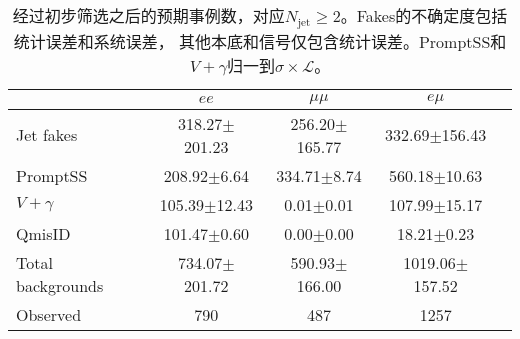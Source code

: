 \begin{table}[h]
\begin{center}
\begin{tabular}{l|cccc}
\hline
\hline
                 &$ee$                   &$\mu\mu$            &$e\mu$           \\
\hline
Jet fakes        &318.27$\pm$201.23       &256.20$\pm$165.77       &332.69$\pm$156.43 \\
 PromptSS        &208.92$\pm$6.64       &334.71$\pm$8.74       &560.18$\pm$10.63 \\
$V+\gamma$        &105.39$\pm$12.43       &0.01$\pm$0.01       &107.99$\pm$15.17\\
   QmisID        &101.47$\pm$0.60       &0.00$\pm$0.00       &18.21$\pm$0.23\\
\hline
Total backgrounds       &734.07$\pm$201.72       &590.93$\pm$166.00       &1019.06$\pm$157.52 \\
Observed        &790       &487       &1257 \\
\hline
\hline
\end{tabular}
\caption{经过初步筛选之后的预期事例数，对应$N_{\text{jet}}\geq2$。Fakes的不确定度包括统计误差和系统误差，
其他本底和信号仅包含统计误差。PromptSS和$V+\gamma$归一到$\sigma\times\mathcal{L}$。}
\label{tab:event_yield_low_Njet_CR}
\end{center}
\end{table}

